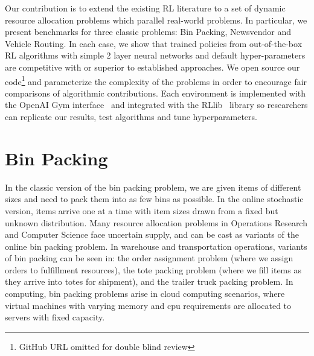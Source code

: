 \documentclass[letterpaper]{article} %
\begin{document}
Our contribution is to extend the existing RL literature to a set of dynamic resource allocation problems which parallel real-world problems. In particular, we present benchmarks for three classic problems: Bin Packing, Newsvendor and Vehicle Routing.  In each case, we show that trained policies from out-of-the-box RL algorithms with simple 2 layer neural networks and default hyper-parameters are competitive with or superior to established approaches. %
We open source our code\footnote{GitHub URL omitted for double blind review} and parameterize the complexity of the problems in order to encourage fair comparisons of algorithmic contributions.  Each environment is implemented with the OpenAI Gym interface~\cite{brockman2016openai} and integrated with the RLlib~\cite{liang2018rllib} library so researchers can  replicate our results, test algorithms and tune hyperparameters. %

\section{Bin Packing}
\label{binpacking}

In the classic version of the bin packing problem, we are given items of different sizes and need to pack them into as few bins as possible. In the online stochastic version, items arrive one at a time with item sizes drawn from a fixed but unknown distribution. 
Many resource allocation problems in Operations Research and Computer Science face uncertain supply, and can be cast as variants of the online bin packing problem. In warehouse and transportation operations, variants of bin packing can be seen in: the order assignment problem (where we assign orders to fulfillment resources), the tote packing problem (where we fill items as they arrive into totes for shipment), and the trailer truck packing problem. In computing, bin packing problems arise in cloud computing scenarios, where virtual machines with varying memory and cpu requirements are allocated to servers with fixed capacity. %
\end{document}
